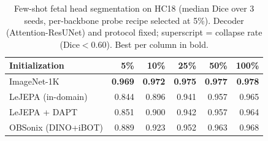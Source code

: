 \begin{table}[t]
\centering
\caption{Few-shot fetal head segmentation on HC18 (median Dice over 3 seeds, per-backbone probe recipe selected at 5\%). Decoder (Attention-ResUNet) and protocol fixed; superscript = collapse rate (Dice$<$0.60). Best per column in bold.}
\label{tab:fewshot}
\begin{tabular}{lrrrrr}
\toprule
Initialization & 5\% & 10\% & 25\% & 50\% & 100\% \\
\midrule
ImageNet-1K & \textbf{0.969} & \textbf{0.972} & \textbf{0.975} & \textbf{0.977} & \textbf{0.978} \\
LeJEPA (in-domain) & 0.844 & 0.896 & 0.941 & 0.957 & 0.965 \\
LeJEPA + DAPT & 0.851 & 0.900 & 0.942 & 0.957 & 0.964 \\
OBSonix (DINO+iBOT) & 0.889 & 0.923 & 0.952 & 0.963 & 0.968 \\
\bottomrule
\end{tabular}
\end{table}